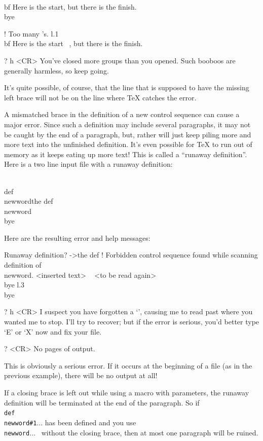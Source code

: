 \beginuser 
\\bf Here is the start\rb, but there is the finish. 
\\bye 
\enduser 

\beginuser \obeyspaces 
! Too many \rb's. 
l.1 \\bf Here is the start\rb 
\                          , but there is the finish. 

? h <CR> 
You've closed more groups than you opened. 
Such booboos are generally harmless, so keep going. 
\enduser 

It's quite possible, of course, that the line that is supposed to 
have the missing left brace will not be on the line where \TeX{} 
catches the error. 

A mismatched brace in the definition of a new control sequence 
can cause a major error.  Since such a definition may include 
several paragraphs, it may not be caught by the end of a 
paragraph, but, rather will just keep piling more and more text 
into the unfinished definition.  It's even possible for \TeX{} to 
run out of memory as it keeps eating up more text! This is called 
a ``runaway definition''. 
Here is a two line input file with a runaway definition: 

\vbox{ 
\beginuser 
\\def\\newword\lb the def 
\\newword 
\\bye 
\enduser 
} 

Here are the resulting error and help messages: 

\beginuser \obeyspaces 
Runaway definition? 
->the def 
! Forbidden control sequence found while scanning definition of \\newword. 
<inserted text> 
\                \rb 
<to be read again> 
\                   \\bye 
l.3 \\bye 

? h <CR> 
I suspect you have forgotten a `\rb', causing me 
to read past where you wanted me to stop. 
I'll try to recover; but if the error is serious, 
you'd better type `E' or `X' now and fix your file. 

? <CR> 
No pages of output. 
\enduser 

This is obviously a serious error.  If it occurs at the beginning 
of a file (as in the previous example), there will be no output 
at all! 

If a closing brace is left out while using a macro with 
parameters, the runaway definition will be terminated at the end 
of the paragraph. So if {\tt \\def\\newword\#1\lb$\ldots$\rb} has 
been defined and you use {\tt \\newword\lb$\dots$ } without the 
closing brace, then at most one paragraph will be ruined. 

